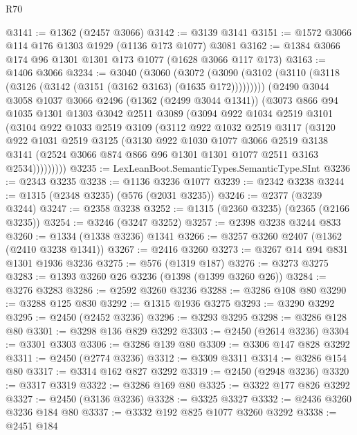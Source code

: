 \begin{lexlean}{R70}
\begin{coremodule}
@3141 := @1362 (@2457 @3066)
@3142 := @3139 @3141
@3151 := @1572 @3066 @114 @176 @1303 @1929 (@1136 @173 @1077) @3081
@3162 := @1384 @3066 @174 @96 @1301 @1301 @173 @1077 (@1628 @3066 @117 @173)
@3163 := @1406 @3066
@3234 := @3040
    (@3060
      (@3072 (@3090 (@3102 (@3110 (@3118 (@3126 (@3142 (@3151 (@3162 @3163) (@1635 @172)))))))))
      (@2490
        @3044
        @3058
        @1037
        @3066
        @2496
        (@1362 (@2499 @3044 @1341))
        (@3073
          @866
          @94
          @1035
          @1301
          @1303
          @3042
          @2511
          @3089
          (@3094
            @922
            @1034
            @2519
            @3101
            (@3104
              @922
              @1033
              @2519
              @3109
              (@3112
                @922
                @1032
                @2519
                @3117
                (@3120
                  @922
                  @1031
                  @2519
                  @3125
                  (@3130
                    @922
                    @1030
                    @1077
                    @3066
                    @2519
                    @3138
                    @3141
                    (@2524 @3066 @874 @866 @96 @1301 @1301 @1077 @2511 @3163 @2534)))))))))
@3235 := LexLeanBoot.SemanticTypes.SemanticType.SInt
@3236 := @2343 @3235
@3238 := @1136 @3236 @1077
@3239 := @2342 @3238
@3244 := @1315 (@2348 @3235) (@576 (@2031 @3235))
@3246 := @2377 (@3239 @3244)
@3247 := @2358 @3238
@3252 := @1315 (@2360 @3235) (@2365 (@2166 @3235))
@3254 := @3246 (@3247 @3252)
@3257 := @2398 @3238 @3244 @833
@3260 := @1334 (@1338 @3236) @1341
@3266 := @3257 @3260 @2407 (@1362 (@2410 @3238 @1341))
@3267 := @2416 @3260
@3273 := @3267 @14 @94 @831 @1301 @1936 @3236
@3275 := @576 (@1319 @187)
@3276 := @3273 @3275
@3283 := @1393 @3260 @26 @3236 (@1398 (@1399 @3260 @26))
@3284 := @3276 @3283
@3286 := @2592 @3260 @3236
@3288 := @3286 @108 @80
@3290 := @3288 @125 @830
@3292 := @1315 @1936 @3275
@3293 := @3290 @3292
@3295 := @2450 (@2452 @3236)
@3296 := @3293 @3295
@3298 := @3286 @128 @80
@3301 := @3298 @136 @829 @3292
@3303 := @2450 (@2614 @3236)
@3304 := @3301 @3303
@3306 := @3286 @139 @80
@3309 := @3306 @147 @828 @3292
@3311 := @2450 (@2774 @3236)
@3312 := @3309 @3311
@3314 := @3286 @154 @80
@3317 := @3314 @162 @827 @3292
@3319 := @2450 (@2948 @3236)
@3320 := @3317 @3319
@3322 := @3286 @169 @80
@3325 := @3322 @177 @826 @3292
@3327 := @2450 (@3136 @3236)
@3328 := @3325 @3327
@3332 := @2436 @3260 @3236 @184 @80
@3337 := @3332 @192 @825 @1077 @3260 @3292
@3338 := @2451 @184

\end{coremodule}
\end{lexlean}
